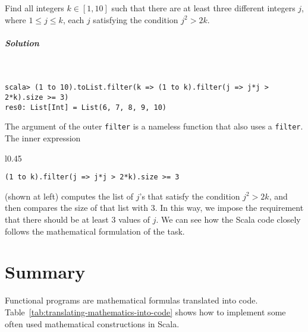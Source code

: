 Find all integers $k\in\left[1,10\right]$ such that there are at
least three different integers $j$, where $1\leq j\leq k$, each
$j$ satisfying the condition $j^{2}>2k$.

\subparagraph{Solution}

~

\begin{lstlisting}
scala> (1 to 10).toList.filter(k => (1 to k).filter(j => j*j > 2*k).size >= 3)
res0: List[Int] = List(6, 7, 8, 9, 10) 
\end{lstlisting}
The argument of the outer \lstinline!filter! is a nameless function
that also uses a \lstinline!filter!. The inner expression

\noindent \begin{wrapfigure}{l}{0.45\columnwidth}%
\vspace{-0.8\baselineskip}
\begin{lstlisting}
(1 to k).filter(j => j*j > 2*k).size >= 3
\end{lstlisting}

\vspace{-1.5\baselineskip}
\end{wrapfigure}%
 (shown at left) computes the list of $j$\textsf{'}s that satisfy the condition
$j^{2}>2k$, and then compares the size of that list with $3$. In
this way, we impose the requirement that there should be at least
$3$ values of $j$. We can see how the Scala code closely follows
the mathematical formulation of the task.

\section{Summary}

Functional programs are mathematical formulas translated into code.
Table~\ref{tab:translating-mathematics-into-code} shows how to implement
some often used mathematical constructions in Scala.

